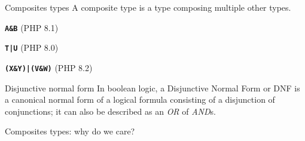 \documentclass[aspectratio=169]{beamer}
\newcommand{\type}[1]{\texttt{\textbf{#1}}}
\begin{document}
\begin{frame}{Composites types}
    A composite type is a type composing multiple other types.
    \begin{description}
     \item[Intersection type:] \type{A\&B} (PHP 8.1)
     \item[Simple union type:] \type{T|U} (PHP 8.0)
     \item[DNF type:] \type{(X\&Y)|(V\&W)} (PHP 8.2)
    \end{description}
    \begin{block}{Disjunctive normal form}
        In boolean logic, a \alert{Disjunctive Normal Form} or \alert{DNF} is a canonical normal form of a logical formula consisting of a disjunction of conjunctions; it can also be described as an \emph{OR} of \emph{AND}s.
        \cite{noauthor_disjunctive_2022}
    \end{block}
\end{frame}
\begin{frame}{Composites types: why do we care?}
\begin{center}
\end{center}
\end{frame}
\end{document}
